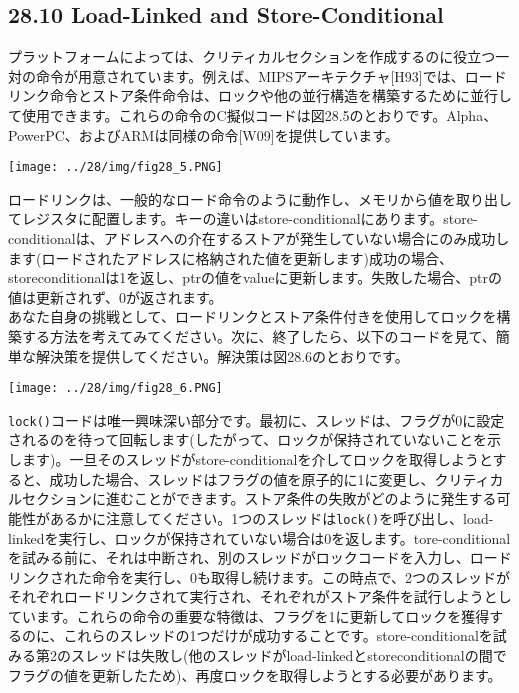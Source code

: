 \hypertarget{load-linked-and-store-conditional}{%
\subsection*{28.10 Load-Linked and
Store-Conditional}\label{load-linked-and-store-conditional}}

プラットフォームによっては、クリティカルセクションを作成するのに役立つ一対の命令が用意されています。例えば、MIPSアーキテクチャ{[}H93{]}では、ロードリンク命令とストア条件命令は、ロックや他の並行構造を構築するために並行して使用できます。これらの命令のC擬似コードは図28.5のとおりです。Alpha、PowerPC、およびARMは同様の命令{[}W09{]}を提供しています。

\texttt{[image: ../28/img/fig28\_5.PNG]}

ロードリンクは、一般的なロード命令のように動作し、メモリから値を取り出してレジスタに配置します。キーの違いはstore-conditionalにあります。store-conditionalは、アドレスへの介在するストアが発生していない場合にのみ成功します(ロードされたアドレスに格納された値を更新します)成功の場合、storeconditionalは1を返し、ptrの値をvalueに更新します。失敗した場合、ptrの値は更新されず、0が返されます。\\
あなた自身の挑戦として、ロードリンクとストア条件付きを使用してロックを構築する方法を考えてみてください。次に、終了したら、以下のコードを見て、簡単な解決策を提供してください。解決策は図28.6のとおりです。

\texttt{[image: ../28/img/fig28\_6.PNG]}

\texttt{lock()}コードは唯一興味深い部分です。最初に、スレッドは、フラグが0に設定されるのを待って回転します(したがって、ロックが保持されていないことを示します)。一旦そのスレッドがstore-conditionalを介してロックを取得しようとすると、成功した場合、スレッドはフラグの値を原子的に1に変更し、クリティカルセクションに進むことができます。ストア条件の失敗がどのように発生する可能性があるかに注意してください。1つのスレッドは\texttt{lock()}を呼び出し、load-linkedを実行し、ロックが保持されていない場合は0を返します。tore-conditionalを試みる前に、それは中断され、別のスレッドがロックコードを入力し、ロードリンクされた命令を実行し、0も取得し続けます。この時点で、2つのスレッドがそれぞれロードリンクされて実行され、それぞれがストア条件を試行しようとしています。これらの命令の重要な特徴は、フラグを1に更新してロックを獲得するのに、これらのスレッドの1つだけが成功することです。store-conditionalを試みる第2のスレッドは失敗し(他のスレッドがload-linkedとstoreconditionalの間でフラグの値を更新したため)、再度ロックを取得しようとする必要があります。

